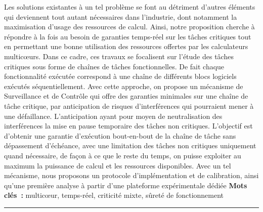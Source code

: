 \documentclass[french, a4paper, 11pt, twoside, pdftex]{StyleThese}
\begin{document}
\begin{vcenterpage}
{		Les solutions existantes à un tel problème se font au détriment d'autres éléments qui deviennent tout autant nécessaires dans l'industrie, dont notamment la maximisation d'usage des ressources de calcul. Ainsi, notre proposition cherche à répondre à la fois au besoin de garanties temps-réel sur les tâches critiques tout en permettant une bonne utilisation des ressources offertes par les calculateurs multicœurs. Dans ce cadre, ces travaux se focalisent sur l'étude des tâches critiques sous forme de chaînes de tâches fonctionnelles. De fait chaque fonctionnalité exécutée correspond à une chaîne de différents blocs logiciels exécutés séquentiellement. Avec cette approche, on propose un mécanisme de Surveillance et de Contrôle qui offre des garanties minimales sur une chaîne de tâche critique, par anticipation de risques d'interférences qui pourraient mener à une défaillance. L'anticipation ayant pour moyen de neutralisation des interférences la mise en pause temporaire des tâches non critiques. L'objectif est d'obtenir une garantie d'exécution bout-en-bout de la chaîne de tâche sans dépassement d'échéance, avec une limitation des tâches non critiques uniquement quand nécessaire, de façon à ce que le reste du temps, on puisse exploiter au maximum la puissance de calcul et les ressources disponibles. Avec un tel mécanisme, nous proposons un protocole d'implémentation et de calibration, ainsi qu'une première analyse à partir d'une plateforme expérimentale dédiée
	}
\smallbreak
{\large\textbf{Mots clés~:} multicœur, temps-réel, criticité mixte, sûreté de fonctionnement}
\\
\noindent\rule[2pt]{\textwidth}{0.5pt}
\end{vcenterpage}
\end{document}
